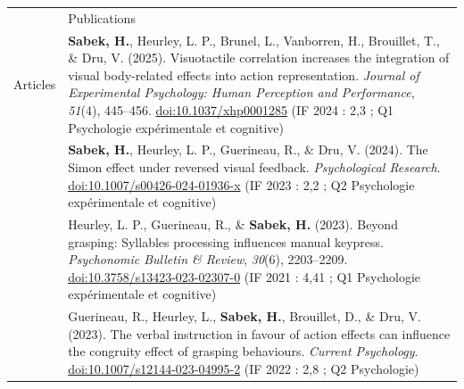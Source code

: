 \documentclass[a4paper, 11pt]{article}
\newcommand{\headingfont}{\Large\color{PineGreen}}
\newcommand{\metric}[1]{{\small\color{darkgray}(#1)}}
\newenvironment{SectionTable}[1]{
	\renewcommand*{\arraystretch}{1.1}
	\setlength{\tabcolsep}{8pt}
	\begin{longtable}{Rp{5.15in}} & #1 \\*}
{\end{longtable}\vspace{2pt}}
\begin{document}
\begin{SectionTable}{\headingfont Publications}
	Articles &
	\textbf{Sabek, H.}, Heurley, L. P., Brunel, L., Vanborren, H., Brouillet, T., \& Dru, V. (2025).
	Visuotactile correlation increases the integration of visual body-related effects into action representation.
	\textit{Journal of Experimental Psychology: Human Perception and Performance}, \textit{51}(4), 445--456.
	\href{https://doi.org/10.1037/xhp0001285}{doi:10.1037/xhp0001285}
	\metric{IF 2024 : 2,3 ; Q1 Psychologie expérimentale et cognitive}\\

	&
	\textbf{Sabek, H.}, Heurley, L. P., Guerineau, R., \& Dru, V. (2024).
	The Simon effect under reversed visual feedback.
	\textit{Psychological Research}.
	\href{https://doi.org/10.1007/s00426-024-01936-x}{doi:10.1007/s00426-024-01936-x}
	\metric{IF 2023 : 2,2 ; Q2 Psychologie expérimentale et cognitive}\\

	&
	Heurley, L. P., Guerineau, R., \& \textbf{Sabek, H.} (2023).
	Beyond grasping: Syllables processing influences manual keypress.
	\textit{Psychonomic Bulletin \& Review}, \textit{30}(6), 2203--2209.
	\href{https://doi.org/10.3758/s13423-023-02307-0}{doi:10.3758/s13423-023-02307-0}
	\metric{IF 2021 : 4,41 ; Q1 Psychologie expérimentale et cognitive}\\

	&
	Guerineau, R., Heurley, L., \textbf{Sabek, H.}, Brouillet, D., \& Dru, V. (2023).
	The verbal instruction in favour of action effects can influence the congruity effect of grasping behaviours.
	\textit{Current Psychology}.
	\href{https://doi.org/10.1007/s12144-023-04995-2}{doi:10.1007/s12144-023-04995-2}
	\metric{IF 2022 : 2,8 ; Q2 Psychologie}\\
\end{SectionTable}
\end{document}
